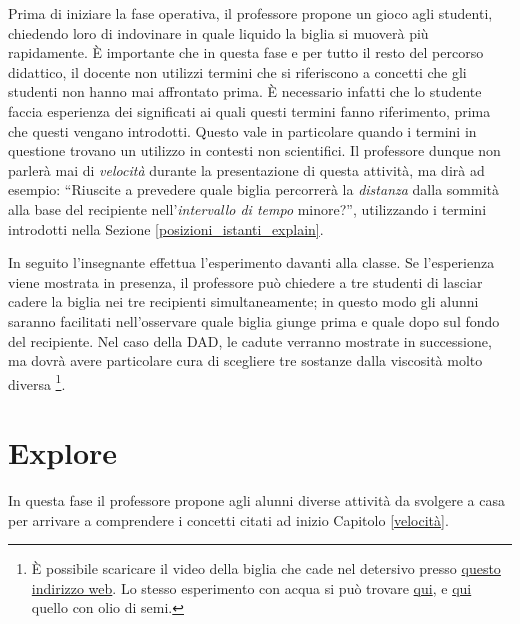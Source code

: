 \documentclass{report} \usepackage[T1]{fontenc} \usepackage[italian]{babel}
\begin{document}
Prima di iniziare la fase operativa, il professore propone un gioco
agli studenti, chiedendo loro di indovinare in quale liquido la biglia
si muoverà più rapidamente. \`E importante che in questa fase e per
tutto il resto del percorso didattico, il docente non utilizzi termini
che si riferiscono a concetti che gli studenti non hanno mai
affrontato prima. \`E necessario infatti che lo studente faccia
esperienza dei significati ai quali questi termini fanno riferimento,
prima che questi vengano introdotti. Questo vale in particolare
quando i termini in questione trovano un utilizzo in contesti
non scientifici\cite{arons1997teaching}.
Il professore dunque non parlerà mai di \emph{velocità} durante
la presentazione di questa attività, ma dirà ad esempio:
``Riuscite a prevedere quale biglia percorrerà la \emph{distanza}
dalla sommità alla base del recipiente nell'\emph{intervallo di tempo}
minore?'', utilizzando i termini introdotti nella Sezione
\ref{posizioni_istanti_explain}.

In seguito l'insegnante effettua l'esperimento davanti alla classe.
Se l'esperienza viene mostrata in presenza, il professore
può chiedere a tre studenti di lasciar cadere la biglia nei tre recipienti
simultaneamente; in questo modo gli alunni saranno facilitati
nell'osservare quale biglia giunge prima e quale dopo sul fondo del
recipiente. Nel caso della DAD, le cadute verranno mostrate in successione,
 ma dovrà avere particolare cura di scegliere tre sostanze dalla
viscosità molto diversa
\footnote{
          \`E possibile scaricare il video della biglia che
          cade nel detersivo presso
          \textcolor{blue}{\href{https://github.com/savaroskij/PED1/blob/master/progetto_finale/media/video/velocity_engage_videos/detersivo.mp4?raw=true}{questo indirizzo web}}.
          Lo stesso esperimento con acqua si può trovare
          \textcolor{blue}{\href{https://github.com/savaroskij/PED1/blob/master/progetto_finale/media/video/velocity_engage_videos/acqua.mp4?raw=true}{qui}},
          e
          \textcolor{blue}{\href{https://github.com/savaroskij/PED1/blob/master/progetto_finale/media/video/velocity_engage_videos/olio_semi.mp4?raw=true}{qui}}
          quello con olio di semi.
         }.

\section{Explore}
In questa fase il professore propone agli alunni diverse attività da svolgere a
casa per arrivare a comprendere i concetti citati ad inizio Capitolo
\ref{velocità}.
\end{document}
